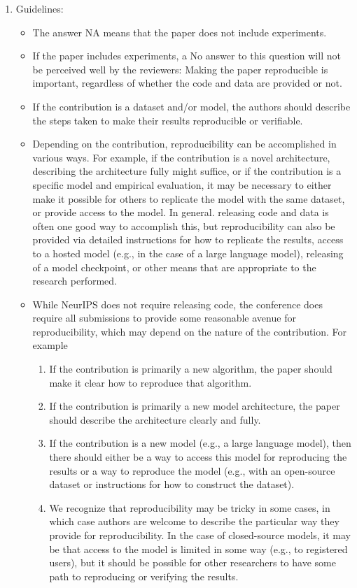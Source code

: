 \documentclass{article}
\theoremstyle{plain}
\theoremstyle{definition}
\theoremstyle{remark}
\begin{document}
\begin{enumerate}
    \item[] Guidelines:
    \begin{itemize}
        \item The answer NA means that the paper does not include experiments.
        \item If the paper includes experiments, a No answer to this question will not be perceived well by the reviewers: Making the paper reproducible is important, regardless of whether the code and data are provided or not.
        \item If the contribution is a dataset and/or model, the authors should describe the steps taken to make their results reproducible or verifiable. 
        \item Depending on the contribution, reproducibility can be accomplished in various ways. For example, if the contribution is a novel architecture, describing the architecture fully might suffice, or if the contribution is a specific model and empirical evaluation, it may be necessary to either make it possible for others to replicate the model with the same dataset, or provide access to the model. In general. releasing code and data is often one good way to accomplish this, but reproducibility can also be provided via detailed instructions for how to replicate the results, access to a hosted model (e.g., in the case of a large language model), releasing of a model checkpoint, or other means that are appropriate to the research performed.
        \item While NeurIPS does not require releasing code, the conference does require all submissions to provide some reasonable avenue for reproducibility, which may depend on the nature of the contribution. For example
        \begin{enumerate}
            \item If the contribution is primarily a new algorithm, the paper should make it clear how to reproduce that algorithm.
            \item If the contribution is primarily a new model architecture, the paper should describe the architecture clearly and fully.
            \item If the contribution is a new model (e.g., a large language model), then there should either be a way to access this model for reproducing the results or a way to reproduce the model (e.g., with an open-source dataset or instructions for how to construct the dataset).
            \item We recognize that reproducibility may be tricky in some cases, in which case authors are welcome to describe the particular way they provide for reproducibility. In the case of closed-source models, it may be that access to the model is limited in some way (e.g., to registered users), but it should be possible for other researchers to have some path to reproducing or verifying the results.
        \end{enumerate}
    \end{itemize}



\end{enumerate}
\end{document}
